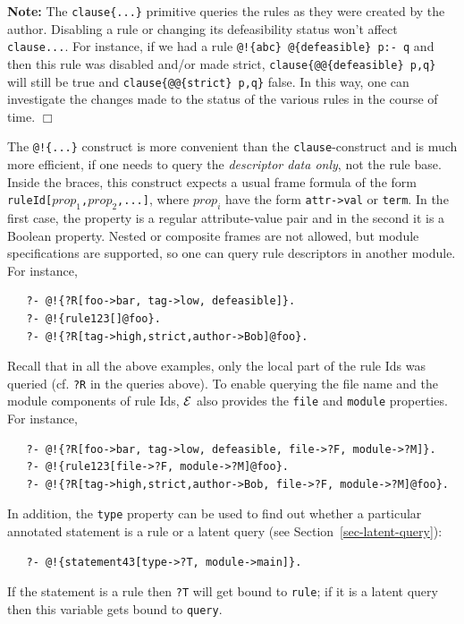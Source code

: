 \documentclass[11pt]{article}
\newcommand{\ERGO}{\mbox{\ensuremath{\cal{E}}\smaller{{\sc{RGO}}}}\xspace}
\newcommand{\FLSYSTEM}{\ERGO}
\begin{document}
\noindent
\textbf{Note:} The \texttt{clause\{...\}} primitive queries the rules as
they were created by the author. Disabling a rule or changing its
defeasibility status won't affect \texttt{clause{...}}.
For instance, if we had a
rule \texttt{@!\{abc\} @\{defeasible\} p:- q}
and then this rule was disabled and/or
made strict, \texttt{clause\{@@\{defeasible\} p,q\}}
will still be true and
\texttt{clause\{@@\{strict\} p,q\}} 
false. In this way, one can investigate the changes
made to the status of the various rules in the course of time.   
\hfill $\Box$

The \texttt{@!\{...\}} construct is more convenient than the
\texttt{clause}-construct and is much more efficient,
if one needs to query the \emph{descriptor data
  only}, not the rule base. Inside the braces, this construct expects a
usual frame formula of the form \texttt{ruleId[$prop_1$,$prop_2$,...]}, where
$prop_i$ have the form \texttt{attr->val} or \texttt{term}. In the first
case, the property is a regular attribute-value pair and in the second it
is a Boolean property. Nested or composite frames are not allowed, but
module specifications are supported, so one can query rule descriptors in
another module. For instance,
\begin{verbatim}
   ?- @!{?R[foo->bar, tag->low, defeasible]}.
   ?- @!{rule123[]@foo}.
   ?- @!{?R[tag->high,strict,author->Bob]@foo}.
\end{verbatim}
Recall that in all the above examples, only the local part of the rule Ids was
queried (cf. \texttt{?R} in the queries above). To enable querying the file
name and the module components of rule Ids, \FLSYSTEM also provides the
\texttt{file} and \texttt{module} properties. For instance,
\begin{verbatim}
   ?- @!{?R[foo->bar, tag->low, defeasible, file->?F, module->?M]}.
   ?- @!{rule123[file->?F, module->?M]@foo}.
   ?- @!{?R[tag->high,strict,author->Bob, file->?F, module->?M]@foo}.
\end{verbatim}
In addition, the \texttt{type}  property can be used to find out whether a particular
annotated statement is a rule or a latent query (see
Section~\ref{sec-latent-query}):
\begin{verbatim}
   ?- @!{statement43[type->?T, module->main]}.
\end{verbatim}
If the statement is a rule then \texttt{?T} will get bound to
\texttt{rule}; if it is a latent query then this variable gets
bound to \texttt{query}. 
\end{document}
